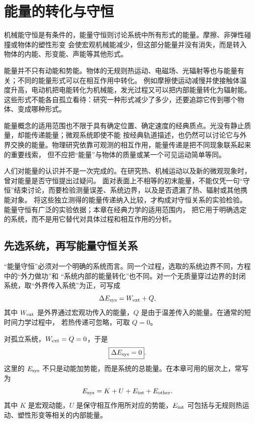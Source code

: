 {
\graphicspath{{../../../sample/xes-original/thirteenth-section/}}
\section{能量的转化与守恒}
机械能守恒是有条件的，能量守恒则讨论系统中所有形式的能量。摩擦、非弹性碰撞或物体的塑性形变
会使宏观机械能减少，但这部分能量并没有消失，而是转入物体的内能、形变能、声能等其他形式。

能量并不只有动能和势能。物体的无规则热运动、电磁场、光辐射等也与能量有关；不同的能量形式可以在相互作用中转化。
例如摩擦使运动减慢并使接触体温度升高，电动机把电能转化为机械能，发光过程又可以把内部能量转化为辐射能。
这些形式不能各自孤立看待：研究一种形式减少了多少，还要追踪它传到哪个物体、变成哪种形式。

能量概念的适用范围也不限于具有确定位置、确定速度的经典质点。光没有静止质量，却能传递能量；微观系统即使不能
按经典轨道描述，也仍然可以讨论它与外界交换的能量。物理研究依靠可观测的相互作用，能量传递是把不同现象联系起来的重要线索，
但不应把“能量”与物体的质量或某一个可见运动简单等同。

人们对能量的认识并不是一次完成的。在研究热、机械运动以及新的微观现象时，曾对能量是否守恒提出过疑问。
面对表面上不相等的初末能量，不能仅凭一句“守恒”结束讨论，而要检验测量误差、系统边界，以及是否遗漏了热、辐射或其他携能对象。
将这些独立测得的能量传递纳入比较，才构成对守恒关系的实验检验。能量守恒有广泛的实验依据；本章在经典力学的适用范围内，
把它用于明确选定的系统，而不是用它替代对具体过程和相互作用的分析。

\subsection{先选系统，再写能量守恒关系}

“能量守恒”必须对一个明确的系统而言。同一个过程，选取的系统边界不同，方程中的“外力做功”和
“系统内部的能量转化”也不同。对一个无质量穿过边界的封闭系统，取“外界传入系统”为正，可写成
\begin{equation}
  \Delta E_{\rm sys}=W_{\rm ext}+Q,
  \label{ch08:eq:general-energy-account}
\end{equation}
其中 $W_{\rm ext}$ 是外界通过宏观功传入的能量，$Q$ 是由于温差传入的能量。在通常的短时间力学过程中，
若热传递可忽略，可取 $Q=0$。

对孤立系统，$W_{\rm ext}=Q=0$，于是
\begin{equation}
  \boxed{\Delta E_{\rm sys}=0}.
  \label{ch08:eq:isolated-energy}
\end{equation}
这里的 $E_{\rm sys}$ 不只是动能加势能，而是系统的总能量。在本章可用的层次上，常写为
\begin{equation}
  E_{\rm sys}=K+U+E_{\rm int}+E_{\rm other}.
  \label{ch08:eq:energy-components}
\end{equation}
其中 $K$ 是宏观动能，$U$ 是保守相互作用所对应的势能，$E_{\rm int}$ 可包括与无规则热运动、塑性形变等相关的内部能量。

}

